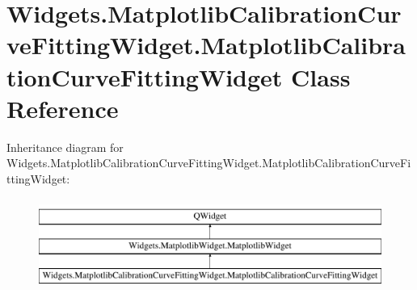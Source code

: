 \hypertarget{classWidgets_1_1MatplotlibCalibrationCurveFittingWidget_1_1MatplotlibCalibrationCurveFittingWidget}{\section{Widgets.\-Matplotlib\-Calibration\-Curve\-Fitting\-Widget.\-Matplotlib\-Calibration\-Curve\-Fitting\-Widget Class Reference}
\label{classWidgets_1_1MatplotlibCalibrationCurveFittingWidget_1_1MatplotlibCalibrationCurveFittingWidget}
}
Inheritance diagram for Widgets.\-Matplotlib\-Calibration\-Curve\-Fitting\-Widget.\-Matplotlib\-Calibration\-Curve\-Fitting\-Widget\-:\begin{figure}[H]
\begin{center}
\leavevmode
\includegraphics[height=3.000000cm]{classWidgets_1_1MatplotlibCalibrationCurveFittingWidget_1_1MatplotlibCalibrationCurveFittingWidget}
\end{center}
\end{figure}
